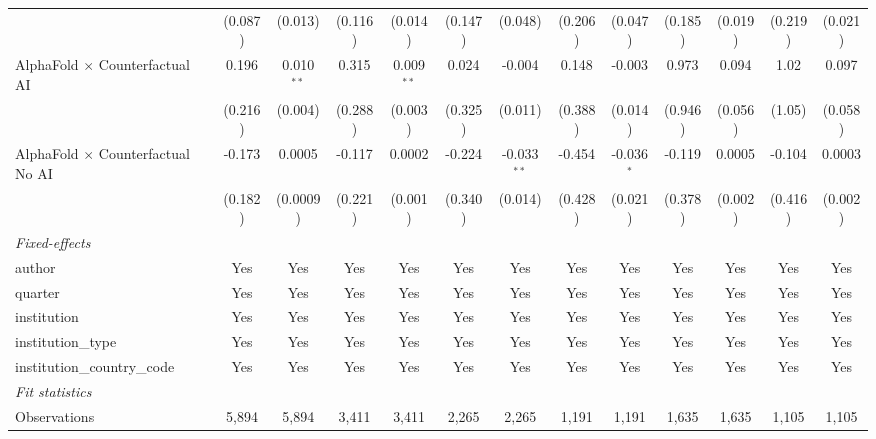 \begin{tabular}{lcccccccccccc}
                                            & (0.087) & (0.013)        & (0.116) & (0.014)        & (0.147) & (0.048)       & (0.206) & (0.047)      & (0.185) & (0.019)       & (0.219) & (0.021)\\   
   AlphaFold $\times$ Counterfactual AI     & 0.196   & 0.010$^{**}$   & 0.315   & 0.009$^{**}$   & 0.024   & -0.004        & 0.148   & -0.003       & 0.973   & 0.094         & 1.02    & 0.097\\   
                                            & (0.216) & (0.004)        & (0.288) & (0.003)        & (0.325) & (0.011)       & (0.388) & (0.014)      & (0.946) & (0.056)       & (1.05)  & (0.058)\\   
   AlphaFold $\times$ Counterfactual No AI  & -0.173  & 0.0005         & -0.117  & 0.0002         & -0.224  & -0.033$^{**}$ & -0.454  & -0.036$^{*}$ & -0.119  & 0.0005        & -0.104  & 0.0003\\   
                                            & (0.182) & (0.0009)       & (0.221) & (0.001)        & (0.340) & (0.014)       & (0.428) & (0.021)      & (0.378) & (0.002)       & (0.416) & (0.002)\\   
   \midrule
   \emph{Fixed-effects}\\
   author                                   & Yes     & Yes            & Yes     & Yes            & Yes     & Yes           & Yes     & Yes          & Yes     & Yes           & Yes     & Yes\\  
   quarter                                  & Yes     & Yes            & Yes     & Yes            & Yes     & Yes           & Yes     & Yes          & Yes     & Yes           & Yes     & Yes\\  
   institution                              & Yes     & Yes            & Yes     & Yes            & Yes     & Yes           & Yes     & Yes          & Yes     & Yes           & Yes     & Yes\\  
   institution\_type                        & Yes     & Yes            & Yes     & Yes            & Yes     & Yes           & Yes     & Yes          & Yes     & Yes           & Yes     & Yes\\  
   institution\_country\_code               & Yes     & Yes            & Yes     & Yes            & Yes     & Yes           & Yes     & Yes          & Yes     & Yes           & Yes     & Yes\\  
   \midrule
   \emph{Fit statistics}\\
   Observations                             & 5,894   & 5,894          & 3,411   & 3,411          & 2,265   & 2,265         & 1,191   & 1,191        & 1,635   & 1,635         & 1,105   & 1,105\\  

\end{tabular}

